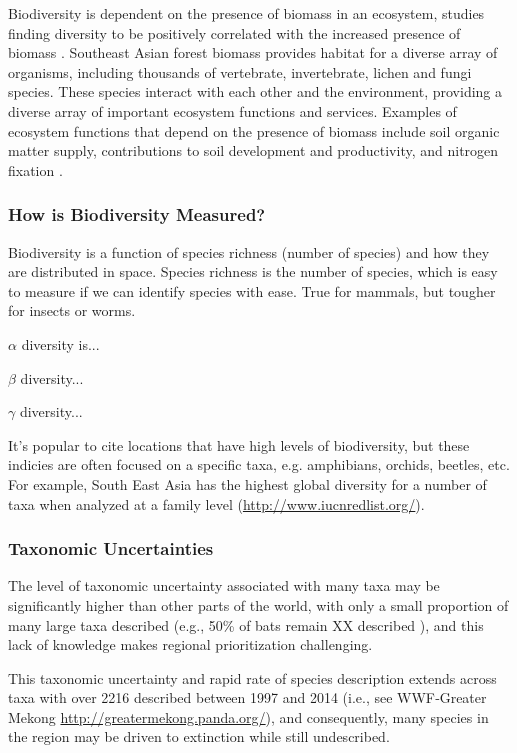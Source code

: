Biodiversity is dependent on the presence of biomass in an ecosystem, studies finding diversity to be positively correlated with the increased presence of biomass \citep{cardinale2007impacts}. Southeast Asian forest biomass provides habitat for a diverse array of organisms, including thousands of vertebrate, invertebrate, lichen and fungi species. These species interact with each other and the environment, providing a diverse array of important ecosystem functions and services. Examples of ecosystem functions that depend on the presence of biomass include soil organic matter supply, contributions to soil development and productivity, and nitrogen fixation \citep{humphrey1999relationships}.

\subsubsection{How is Biodiversity Measured?}

Biodiversity is a function of species richness (number of species) and how they are distributed in space. Species richness is the number of species, which is easy to measure if we can identify species with ease. True for mammals, but tougher for insects or worms. 

$\alpha$ diversity is...

$\beta$ diversity...

$\gamma$ diversity...

It's popular to cite locations that have high levels of biodiversity, but these indicies are often focused on a specific taxa, e.g. amphibians, orchids, beetles, etc. For example, South East Asia has the highest global diversity for a number of taxa when analyzed at a family level (\url{http://www.iucnredlist.org/}). 

\subsubsection{Taxonomic Uncertainties}

The level of taxonomic uncertainty associated with many taxa may be significantly higher than other parts of the world, with only a small proportion of many large taxa described (e.g., 50\% of bats remain XX described \citep{francis2010role}), and this lack of knowledge makes regional prioritization challenging. 

This taxonomic uncertainty and rapid rate of species description extends across taxa with over 2216 described between 1997 and 2014 (i.e., see WWF‐Greater Mekong \url{http://greatermekong.panda.org/}), and consequently, many species in the region may be driven to extinction while still undescribed.

